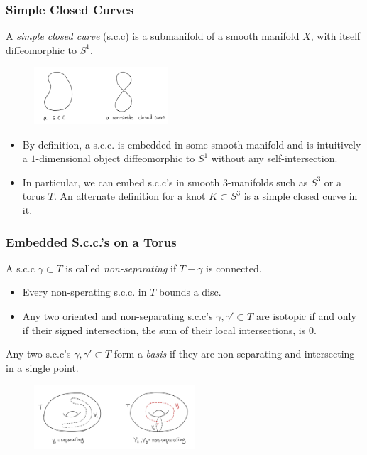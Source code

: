 \documentclass{beamer}
\theoremstyle{ex}
\theoremstyle{rem}
\begin{document}
	\begin{frame}
		\frametitle{Simple Closed Curves}
		\begin{definition}
			A \textit{simple closed curve} (s.c.c) is a submanifold of a smooth manifold $X$, with itself diffeomorphic to $S^1$.
		\end{definition}
		\begin{figure}
			\centering
			\includegraphics[width=50mm]{scc.jpg}
		\end{figure}
		\begin{itemize}
		\item By definition, a s.c.c. is embedded in some smooth manifold and is intuitively a $1$-dimensional object diffeomorphic to $S^1$ without any self-intersection. 
		\item In particular, we can embed s.c.c's in smooth $3$-manifolds such as $S^3$ or a torus $T$. An alternate definition for a knot $K \subset S^3$ is a simple closed curve in it. 
		\end{itemize}
	\end{frame}	

	\begin{frame}	
		\frametitle{Embedded S.c.c.'s on a Torus}
		\begin{definition}
			A s.c.c $\gamma \subset T$ is called \textit{non-separating} if $T-\gamma$ is connected.
		\end{definition}
		\begin{itemize}
		\item Every non-sperating s.c.c. in $T$ bounds a disc.
		\item Any two oriented and non-separating s.c.c's $\gamma, \gamma' \subset T$ are isotopic if and only if their signed intersection, the sum of their local intersections, is $0$.
		\end{itemize}
		\begin{definition} 
			Any two s.c.c's $\gamma, \gamma' \subset T$ form a \textit{basis} if they are non-separating and intersecting in a single point. 
		\end{definition}
		\begin{figure}
			\centering
			\includegraphics[width=60mm]{Separating.jpg}
		\end{figure}
	\end{frame}
\end{document}
